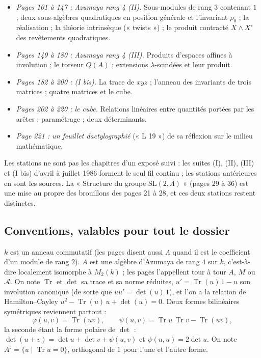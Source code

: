 \documentclass[11pt,a4paper]{article}
\begin{document}
\begin{itemize}
    la page 98.
  \item \emph{Pages 101 à 147 : Azumaya rang 4 (II).} Sous-modules de rang
    $3$ contenant $1$ ; deux sous-algèbres quadratiques en position générale et
    l'invariant $\rho_0$ ; la réalisation ; la théorie intrinsèque
    (« twists ») ; le produit contracté $X \wedge X'$ des revêtements
    quadratiques.
  \item \emph{Pages 149 à 180 : Azumaya rang 4 (III).} Produits d'espaces
    affines à involution ; le torseur $Q(A)$ ; extensions $\lambda$-scindées
    et leur produit.
  \item \emph{Pages 182 à 200 : (I bis).} La trace de $xyz$ ; l'anneau des
    invariants de trois matrices ; quatre matrices et le cube.
  \item \emph{Pages 202 à 220 : le cube.} Relations linéaires entre quantités
    portées par les arêtes ; paramétrage ; deux déterminants.
  \item \emph{Page 221 : un feuillet dactylographié} (« L 19 ») de sa
    réflexion sur le milieu mathématique.
\end{itemize}

Les stations ne sont pas les chapitres d'un exposé suivi : les suites (I),
(II), (III) et (I bis) d'avril à juillet 1986 forment le seul fil continu ; les stations
antérieures en sont les sources. La « Structure du groupe $\mathrm{SL}(2,
\Lambda)$ » (pages 29 à 36) est une mise au propre des brouillons des pages
21 à 28, et ces deux stations restent distinctes.

\subsection*{Conventions, valables pour tout le dossier}

$k$ est un anneau commutatif (les pages disent aussi $\Lambda$ quand il est
le coefficient d'un module de rang $2$). $A$ est une algèbre d'Azumaya de rang
$4$ sur $k$, c'est-à-dire localement isomorphe à $M_2(k)$ ; les pages
l'appellent tour à tour $A$, $M$ ou $\mathcal{A}$. On note
$\operatorname{Tr}$ et $\det$ sa trace et sa norme réduites, $u' =
\operatorname{Tr}(u)\,1 - u$ son involution canonique (de sorte que $uu' =
\det(u)\,1$), et l'on a la relation de Hamilton--Cayley $u^2 -
\operatorname{Tr}(u)\,u + \det(u) = 0$. Deux formes bilinéaires symétriques
reviennent partout :
\[
  \varphi(u, v) = \operatorname{Tr}(uv), \qquad
  \psi(u, v) = \operatorname{Tr}u\,\operatorname{Tr}v - \operatorname{Tr}(uv),
\]
la seconde étant la forme polaire de $\det$ : $\det(u+v) = \det u + \det v +
\psi(u, v)$ et $\psi(u, u) = 2\det u$. On note $A^{\natural} =
\{u \mid \operatorname{Tr}u = 0\}$, orthogonal de $1$ pour l'une et l'autre
forme.
\end{document}
